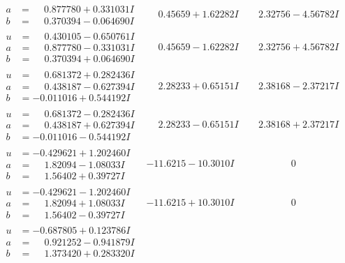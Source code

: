 \documentclass[1p]{elsarticle_modified}
\theoremstyle{definition}
\begin{document}
$$\begin{array}{c|c|c}
\begin{aligned}
a &= \phantom{-}0.877780 + 0.331031 I \\
b &= \phantom{-}0.370394 - 0.064690 I\end{aligned}
 & \phantom{-}0.45659 + 1.62282 I & \phantom{-}2.32756 - 4.56782 I \\ \hline\begin{aligned}
u &= \phantom{-}0.430105 - 0.650761 I \\
a &= \phantom{-}0.877780 - 0.331031 I \\
b &= \phantom{-}0.370394 + 0.064690 I\end{aligned}
 & \phantom{-}0.45659 - 1.62282 I & \phantom{-}2.32756 + 4.56782 I \\ \hline\begin{aligned}
u &= \phantom{-}0.681372 + 0.282436 I \\
a &= \phantom{-}0.438187 - 0.627394 I \\
b &= -0.011016 + 0.544192 I\end{aligned}
 & \phantom{-}2.28233 + 0.65151 I & \phantom{-}2.38168 - 2.37217 I \\ \hline\begin{aligned}
u &= \phantom{-}0.681372 - 0.282436 I \\
a &= \phantom{-}0.438187 + 0.627394 I \\
b &= -0.011016 - 0.544192 I\end{aligned}
 & \phantom{-}2.28233 - 0.65151 I & \phantom{-}2.38168 + 2.37217 I \\ \hline\begin{aligned}
u &= -0.429621 + 1.202460 I \\
a &= \phantom{-}1.82094 - 1.08033 I \\
b &= \phantom{-}1.56402 + 0.39727 I\end{aligned}
 & -11.6215 - 10.3010 I & \phantom{-0.000000 } 0 \\ \hline\begin{aligned}
u &= -0.429621 - 1.202460 I \\
a &= \phantom{-}1.82094 + 1.08033 I \\
b &= \phantom{-}1.56402 - 0.39727 I\end{aligned}
 & -11.6215 + 10.3010 I & \phantom{-0.000000 } 0 \\ \hline\begin{aligned}
u &= -0.687805 + 0.123786 I \\
a &= \phantom{-}0.921252 - 0.941879 I \\
b &= \phantom{-}1.373420 + 0.283320 I\end{aligned}

\end{array}$$
\end{document}
